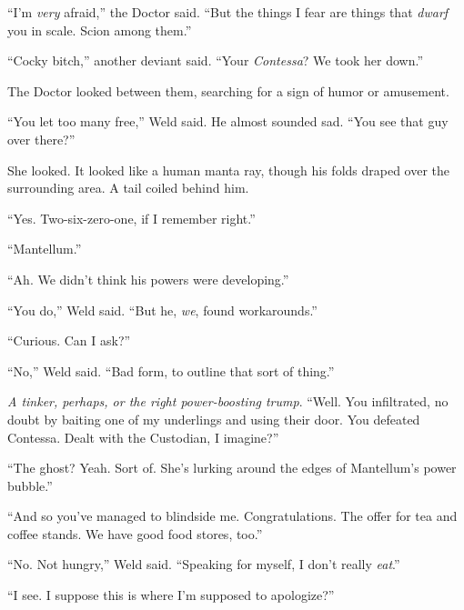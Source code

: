 ``I'm \emph{very} afraid,'' the Doctor said.  ``But the things I fear are things that \emph{dwarf} you in scale.  Scion among them.''



``Cocky bitch,'' another deviant said.  ``Your \emph{Contessa}?  We took her down.''



The Doctor looked between them, searching for a sign of humor or amusement.



``You let too many free,'' Weld said.  He almost sounded sad.  ``You see that guy over there?''



She looked.  It looked like a human manta ray, though his folds draped over the surrounding area.  A tail coiled behind him.



``Yes.  Two-six-zero-one, if I remember right.''



``Mantellum.''



``Ah.  We didn't think his powers were developing.''



``You do,'' Weld said.  ``But he, \emph{we}, found workarounds.''



``Curious.  Can I ask?''



``No,'' Weld said.  ``Bad form, to outline that sort of thing.''



\emph{A tinker, perhaps, or the right power-boosting trump}.  ``Well.  You infiltrated, no doubt by baiting one of my underlings and using their door.  You defeated Contessa.  Dealt with the Custodian, I imagine?''



``The ghost?  Yeah.  Sort of.  She's lurking around the edges of Mantellum's power bubble.''



``And so you've managed to blindside me.  Congratulations.  The offer for tea and coffee stands.  We have good food stores, too.''



``No.  Not hungry,'' Weld said.  ``Speaking for myself, I don't really \emph{eat}.''



``I see.  I suppose this is where I'm supposed to apologize?''



